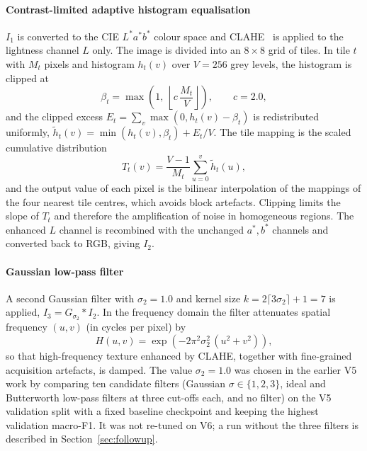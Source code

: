 \paragraph{Contrast-limited adaptive histogram equalisation} $I_1$ is converted to the CIE $L^*a^*b^*$ colour space and CLAHE~\cite{pizer1987adaptive,zuiderveld1994contrast} is applied to the lightness channel $L$ only. The image is divided into an $8\times8$ grid of tiles. In tile $t$ with $M_t$ pixels and histogram $h_t(v)$ over $V=256$ grey levels, the histogram is clipped at
\begin{equation}
\beta_t = \max\!\left(1,\ \left\lfloor c\,\frac{M_t}{V}\right\rfloor\right),\qquad c=2.0,
\end{equation}
and the clipped excess $E_t=\sum_v \max(0,h_t(v)-\beta_t)$ is redistributed uniformly, $\tilde h_t(v)=\min(h_t(v),\beta_t)+E_t/V$. The tile mapping is the scaled cumulative distribution
\begin{equation}
T_t(v)=\frac{V-1}{M_t}\sum_{u=0}^{v}\tilde h_t(u),
\label{eq:clahe}
\end{equation}
and the output value of each pixel is the bilinear interpolation of the mappings of the four nearest tile centres, which avoids block artefacts. Clipping limits the slope of $T_t$ and therefore the amplification of noise in homogeneous regions. The enhanced $L$ channel is recombined with the unchanged $a^*,b^*$ channels and converted back to RGB, giving $I_2$.

\paragraph{Gaussian low-pass filter} A second Gaussian filter with $\sigma_2=1.0$ and kernel size $k=2\lceil 3\sigma_2\rceil+1=7$ is applied, $I_3=G_{\sigma_2}*I_2$. In the frequency domain the filter attenuates spatial frequency $(u,v)$ (in cycles per pixel) by
\begin{equation}
H(u,v)=\exp\!\left(-2\pi^2\sigma_2^2\,(u^2+v^2)\right),
\label{eq:lowpass}
\end{equation}
so that high-frequency texture enhanced by CLAHE, together with fine-grained acquisition artefacts, is damped. The value $\sigma_2=1.0$ was chosen in the earlier V5 work by comparing ten candidate filters (Gaussian $\sigma\in\{1,2,3\}$, ideal and Butterworth low-pass filters at three cut-offs each, and no filter) on the V5 validation split with a fixed baseline checkpoint and keeping the highest validation macro-F1. It was not re-tuned on V6; a run without the three filters is described in Section~\ref{sec:followup}.

